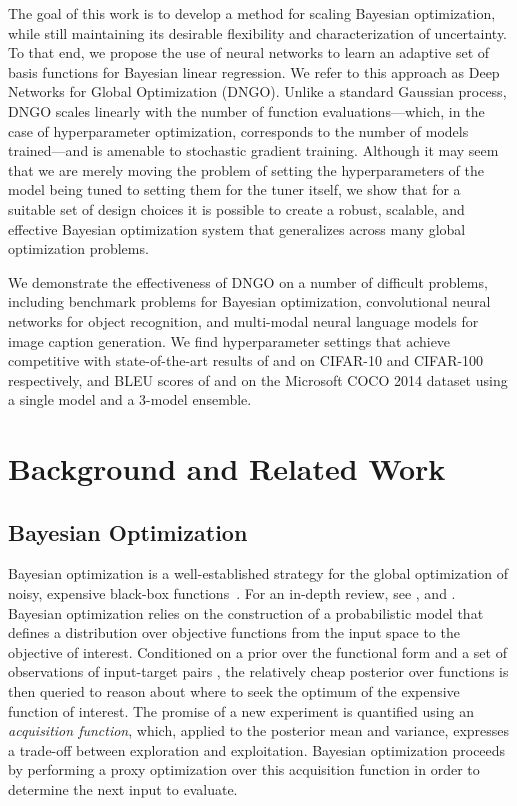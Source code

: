 \documentclass{article}
\begin{document}
The goal of this work is to develop a method for scaling Bayesian optimization, while still maintaining its desirable flexibility and characterization of uncertainty. To that end, we propose the use of neural networks to learn an adaptive set of basis functions for Bayesian linear regression. We refer to this approach as Deep Networks for Global Optimization (DNGO). Unlike a standard Gaussian process, DNGO scales linearly with the number of function evaluations---which, in the case of hyperparameter optimization, corresponds to the number of models trained---and is amenable to stochastic gradient training. Although it may seem that we are merely moving the problem of setting the hyperparameters of the model being tuned to setting them for the tuner itself, we show that for a suitable set of design choices it is possible to create a robust, scalable, and effective Bayesian optimization system that generalizes across many global optimization problems.

We demonstrate the effectiveness of DNGO on a number of difficult problems, including benchmark problems for Bayesian optimization, convolutional neural networks for object recognition, and multi-modal neural language models for image caption generation. We find hyperparameter settings that achieve competitive with state-of-the-art results of  and  on CIFAR-10 and CIFAR-100 respectively, and BLEU scores of  and  on the Microsoft COCO 2014 dataset using a single model and a 3-model ensemble.

\section{Background and Related Work}

\subsection{Bayesian Optimization}
Bayesian optimization is a well-established strategy for the global optimization of noisy, expensive black-box functions~\cite{Mockus1978}.  For an in-depth review, see \citet{lizotte-thesis}, \citet{Brochu2010} and \citet{osborne-2009a}.  Bayesian optimization relies on the construction of a probabilistic model that defines a distribution over objective functions from the input space to the objective of interest.  Conditioned on a prior over the functional form and a set of  observations of input-target pairs , the relatively cheap posterior over functions is then queried to reason about where to seek the optimum of the expensive function of interest. The promise of a new experiment is quantified using an \emph{acquisition function}, which, applied to the posterior mean and variance, expresses a trade-off between exploration and exploitation.  Bayesian optimization proceeds by performing a proxy optimization over this acquisition function in order to determine the next input to evaluate.
\end{document}
